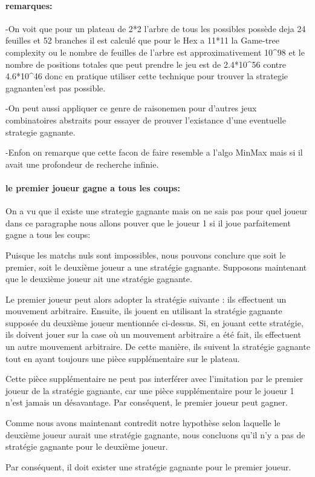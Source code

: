 \paragraph {remarques:}
-On voit que pour un plateau de 2*2 l'arbre de tous les possibles possède deja 24 feuilles et 52 branches
il est calculé que pour le Hex a 11*11 la Game-tree complexity ou le nombre de feuilles de l'arbre est
approximativement 10^98 et le nombre de positions totales que peut prendre le jeu est de 2.4*10^56 contre
4.6*10^46 donc en pratique utiliser cette technique pour trouver la strategie gagnanten'est pas possible.

-On peut aussi appliquer ce genre de raisonemen pour d'autres jeux combinatoires abstraits pour essayer de
prouver l'existance d'une eventuelle strategie gagnante.

-Enfon on remarque que cette facon de faire resemble a l'algo MinMax mais si il avait une profondeur de recherche
infinie.


\paragraph {le premier joueur gagne a tous les coups:}
On a vu que il existe une strategie gagnante mais on ne sais pas pour quel joueur dans ce paragraphe nous allons
pouver que le joueur 1 si il joue parfaitement gagne a tous les coups:

Puisque les matchs nuls sont impossibles, nous pouvons conclure que soit le premier, soit le deuxième joueur a une stratégie
gagnante. Supposons maintenant que le deuxième joueur ait une stratégie gagnante.

Le premier joueur peut alors adopter la stratégie suivante : ils effectuent un mouvement arbitraire. Ensuite, 
ils jouent en utilisant la stratégie gagnante supposée du deuxième joueur mentionnée ci-dessus. Si,
en jouant cette stratégie, ils doivent jouer sur la case où un mouvement arbitraire a été fait, ils effectuent
un autre mouvement arbitraire. De cette manière, ils suivent la stratégie gagnante tout en ayant toujours une pièce
supplémentaire sur le plateau.

Cette pièce supplémentaire ne peut pas interférer avec l'imitation par le premier joueur de la stratégie gagnante, 
car une pièce supplémentaire pour le joueur 1 n'est jamais un désavantage. Par conséquent, le premier joueur peut
gagner.

Comme nous avons maintenant contredit notre hypothèse selon laquelle le deuxième joueur aurait une stratégie gagnante,
nous concluons qu'il n'y a pas de stratégie gagnante pour le deuxième joueur.

Par conséquent, il doit exister une stratégie gagnante pour le premier joueur.